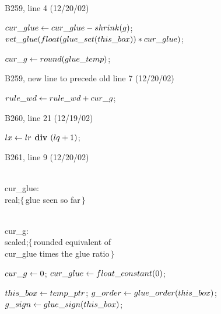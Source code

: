 {\bugonpage B259, line 4 (12/20/02)

\ninepoint\noindent
\qquad{} $\\{cur\_glue}\gets\\{cur\_glue}-\\{shrink}(g)$;
 $\\{vet\_glue}(\\{float}(\\{glue\_set}(\\{this\_box}))*\\{cur\_glue})$;\par
\noindent\qquad\qquad$\\{cur\_g}\gets\\{round}(\\{glue\_temp})$;

\bugonpage B259, new line to precede old line 7 (12/20/02)

\ninepoint\noindent
\quad$\\{rule\_wd}\gets\\{rule\_wd}+\\{cur\_g}$;

\bugonpage B260, line 21 (12/19/02)

\ninepoint\noindent
{} $\\{lx}\gets\\{lr}$ {\bf div} $(\\{lq}+1)$;

\bugonpage B261, line 9 (12/20/02)

\ninepoint\noindent
\qquad\\{cur\_glue}: \\{real};\quad$\{\,$glue seen so far$\,\}$\par\noindent
\qquad\\{cur\_g}: \\{scaled};\quad$\{\,$rounded
  equivalent of \\{cur\_glue} times the glue ratio$\,\}$\par\noindent
{} $\\{cur\_g}\gets0$;
  $\\{cur\_glue}\gets\\{float\_constant}(0)$;\par\noindent
\quad$\\{this\_box}\gets\\{temp\_ptr}$;
 $\\{g\_order}\gets\\{glue\_order}(\\{this\_box})$;
 $\\{g\_sign}\gets\\{glue\_sign}(\\{this\_box})$;

}
